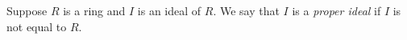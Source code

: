 \documentclass{article}
\begin{document}
Suppose $R$ is a ring and $I$ is an ideal of $R$.  We say that $I$ is a {\it proper ideal} if $I$ is not equal to $R$.
\end{document}
